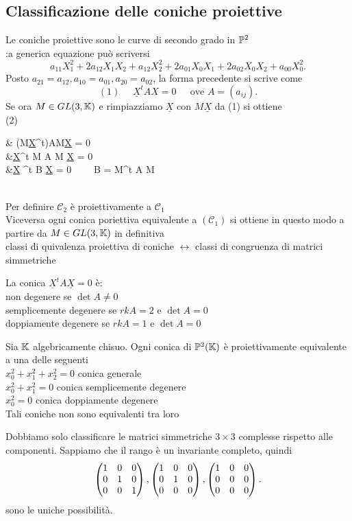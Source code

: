 \documentclass[12px]{article}
\begin{document}
	\subsection{Classificazione delle coniche proiettive}
	Le coniche proiettive sono le curve di secondo grado in $\mathbb{P}^2$\\
	:a generica equazione può scriversi 
	 \[
		 a_{11}X_1^2+2a_{12}X_1X_2+a_{12}X_2^2+2a_{01}X_0X_1+2a_{02}X_0X_2+a_{00}X_0^2
	.\] 
	Posto $a_{21}=a_{12}, a_{10}=a_{01},a_{20}=a_{02}$, la forma precedente si scrive come 
	\[
		(1)\ \ \ \ \ \ 	\underline X^t A X = 0 \ \ \ \ \ \text{ ove } A = (a_{ij})
	.\] 
	Se ora $M\in GL(3,\mathbb{K})$ e rimpiazziamo $\underline X$ con $M\underline X$ da (1) si ottiene \\
	(2)\begin{aligend}
	&	(M\underline X^t)AM\underline X = 0\\
	&\underline X^t M A M \underline X =  0\\
	&\underline X ^t B \underline X = 0 \ \ \ \ B = M^t A M
	\end{aligend} \\
	Per definire $\mathscr{C}_2$ è proiettivamente a $\mathscr{C}_1$ \\
	Viceversa ogni conica poriettiva equivalente a $(\mathscr{C}_1)$ si ottiene in questo modo a partire da $M\in GL(3,\mathbb{K})$ in definitiva\\
	classi di quivalenza proiettiva di coniche $\leftrightarrow $ classi di congruenza di matrici simmetriche 
	\newpage
	\begin{defi}
		La conica  $\underline X^tA\underline X = 0$ è:\\
		non degenere se  $\det A \neq 0$\\
		semplicemente degenere se  $rk A = 2$ e $\det A =0$\\
		doppiamente degenere se  $rk A  = 1$ e $\det A = 0$
	\end{defi}
	\begin{teo}
		Sia $\mathbb{K}$ algebricamente chisuo. Ogni conica di $\mathbb{P}^2(\mathbb{K})$ è proiettivamente equivalente a una delle seguenti\\
		$x_0^2+x_1^2+x_2^2 =0$ conica generale\\
		$x_0^2 +x_1^2 = 0$ conica semplicemente degenere\\
		$x_0^2=0$ conica doppiamente degenere\\
		Tali coniche non sono equivalenti tra loro
	\end{teo}
	\begin{dimo}
		Dobbiamo solo classificare le matrici simmetriche $3\times 3$ complesse rispetto alle componenti. Sappiamo che il rango è un invariante completo, quindi
		\[
			\begin{pmatrix}1&0&0\\0&1&0\\0&0&1\end{pmatrix},\begin{pmatrix}1&0&0\\0&1&0\\0&0&0\end{pmatrix},\begin{pmatrix}1&0&0\\0&0&0\\0&0&0\end{pmatrix}
		.\] 
		sono le uniche possibilità.\\
	\end{dimo}
\end{document}
